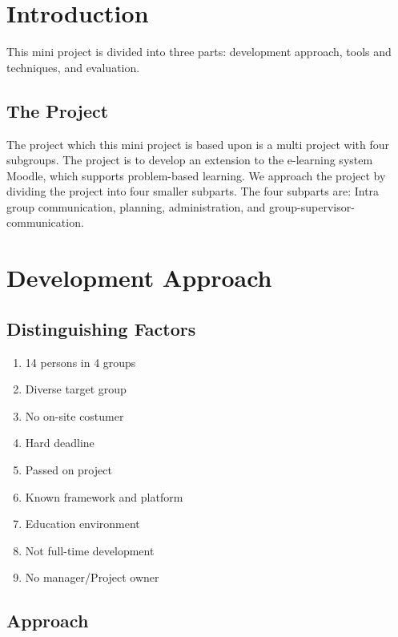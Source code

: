 \documentclass{article}
\begin{document}
\section{Introduction}
This mini project is divided into three parts: development approach, tools and techniques, and evaluation.
\subsection{The Project}
The project which this mini project is based upon is a multi project with four subgroups.
The project is to develop an extension to the e-learning system Moodle, which supports problem-based learning.
We approach the project by dividing the project into four smaller subparts.
The four subparts are: Intra group communication, planning, administration, and group-supervisor-communication.

\section{Development Approach}

\subsection{Distinguishing Factors}
\begin{enumerate}
	\item 14 persons in 4 groups
	\item Diverse target group
	\item No on-site costumer
	\item Hard deadline
	\item Passed on project
	\item Known framework and platform
	\item Education environment
	\item Not full-time development
	\item No manager/Project owner
\end{enumerate}

\subsection{Approach}
\end{document}
